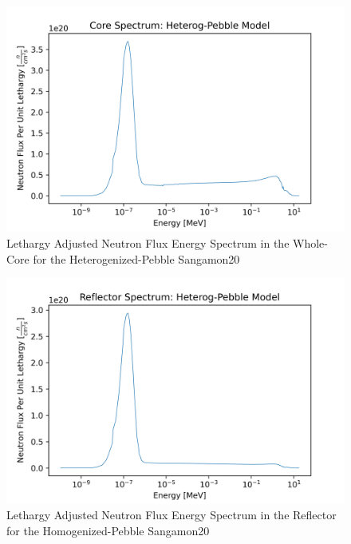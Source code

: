 \begin{figure}[H]
\centering

  \includegraphics[width=0.95\linewidth]{figures/core_spec_het}
  \caption{Lethargy Adjusted Neutron Flux Energy Spectrum in the Whole-Core for the Heterogenized-Pebble Sangamon20}
  \label{fig:het-core}

\end{figure}

\begin{figure}[H]
\centering

  \includegraphics[width=0.95\linewidth]{figures/reflect_spec_het}
  \caption{Lethargy Adjusted Neutron Flux Energy Spectrum in the Reflector for the Homogenized-Pebble Sangamon20}
  \label{fig:het-reflec}

\end{figure}


